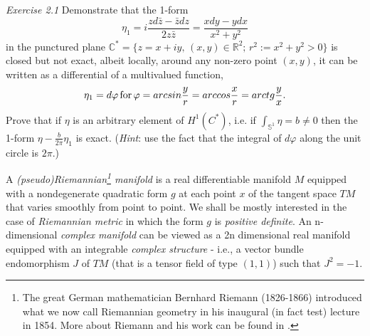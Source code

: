 \documentclass[12pt]{article}
\begin{document}
{\it Exercise 2.1} Demonstrate that the 1-form
\begin{equation}
\label{H1}
\eta_1 = i\frac{zd{\bar z} - {\bar z}dz}{2z{\bar z}} = \frac{xdy - ydx}{x^2 + 
y^2}
\end{equation}
in the punctured plane ${\mathbb C}^* = \{z=x+iy, \, (x,y)\in{\mathbb R}^2; \,
r^2:= x^2 + y^2 > 0\}$ is closed but not exact, albeit locally, around any non-zero
point $(x, y)$, it can be written as a differential of a multivalued function,
\begin{equation}
\label{dphi}
\eta_1 = d\varphi \, {\rm for} \, \varphi = arcsin\frac{y}{r}
= arccos\frac{x}{r} = arctg\frac{y}{x}.
\end{equation}
Prove that if $\eta$ is an arbitrary element of $H^1(C^*)$, i.e. if $\int_{{\mathbb S}^1}
\eta = b\neq 0$ then the 1-form $\eta - \frac{b}{2\pi} \eta_1$ is exact.
({\it Hint}: use the fact that the integral of $d\varphi$ along the unit circle is $2\pi$.)

A {\it (pseudo)Riemannian\footnote{The great German mathematician Bernhard Riemann (1826-1866) 
introduced what we now call Riemannian geometry in his inaugural (in fact test) lecture 
in 1854. More about Riemann and his work can be found in \cite{Mo}.} manifold} is a real
differentiable manifold $M$ equipped with a nondegenerate quadratic form $g$ at each point 
$x$ of the tangent space $TM$ that varies smoothly from point to point. We shall be mostly 
interested in the case of {\it Riemannian metric} in which the form $g$ is {\it positive 
definite}. An n-dimensional {\it complex manifold} can be viewed as a 2n dimensional real
manifold equipped with an integrable {\it complex structure} - i.e., a vector bundle  
endomorphism $J$ of $TM$ (that is a tensor field of type $(1, 1)$) such that $J^2 = -1$.
\end{document}
